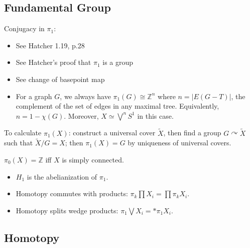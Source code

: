 \hypertarget{fundamental-group}{%
\subsection{Fundamental Group}\label{fundamental-group}}

Conjugacy in \(\pi_1\):

\begin{itemize}
\item
  See Hatcher 1.19, p.28
\item
  See Hatcher's proof that \(\pi_1\) is a group
\item
  See change of basepoint map
\item
  For a graph \(G\), we always have \(\pi_1(G) \cong {\mathbb{Z}}^n\)
  where \(n = |E(G - T)|\), the complement of the set of edges in any
  maximal tree. Equivalently, \(n = 1-\chi(G)\). Moreover,
  \(X \simeq\bigvee^n S^1\) in this case.
\end{itemize}

To calculate \(\pi_1(X)\): construct a universal cover \(\tilde X\),
then find a group \(G \curvearrowright\tilde X\) such that
\(\tilde X/G = X\); then \(\pi_1(X) = G\) by uniqueness of universal
covers.

\begin{proposition}[?]

\(\pi_0(X) = {\mathbb{Z}}\) iff \(X\) is simply connected.

\end{proposition}

\begin{itemize}
\item
  \(H_1\) is the abelianization of \(\pi_1\).
\item
  Homotopy commutes with products:
  \(\pi_k \prod X_i = \prod \pi_k X_i\).
\item
  Homotopy splits wedge products:
  \(\pi_1 \bigvee X_i = \ast \pi_1 X_i\).
\end{itemize}

\hypertarget{homotopy}{%
\subsection{Homotopy}\label{homotopy}}


